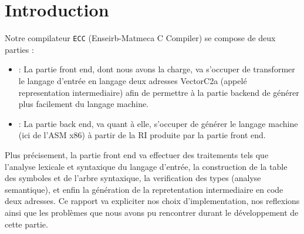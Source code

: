\newpage
\section*{Introduction}

Notre compilateur \verb?ECC? (Enseirb-Matmeca C Compiler) se compose de deux parties :

\begin{itemize}
\item : La partie front end, dont nous avons la charge, va s'occuper de transformer le langage d'entrée en langage deux adresses VectorC2a (appelé representation intermediaire) afin de permettre à la partie backend de générer plus facilement du langage machine.
\item : La partie back end, va quant à elle, s'occuper de générer le langage machine (ici de l'ASM x86) à partir de la RI produite par la partie front end.

\end{itemize}


Plus précisement, la partie front end va effectuer des traitements tels que l'analyse lexicale et syntaxique du langage d'entrée, la construction de la table des symboles et de l'arbre syntaxique, la verification des types (analyse semantique), et enfin la génération de la repretentation intermediaire en code deux adresses.
Ce rapport va expliciter nos choix d'implementation, nos reflexions ainsi que les problèmes que nous avons pu rencontrer durant le développement de cette partie.
		
